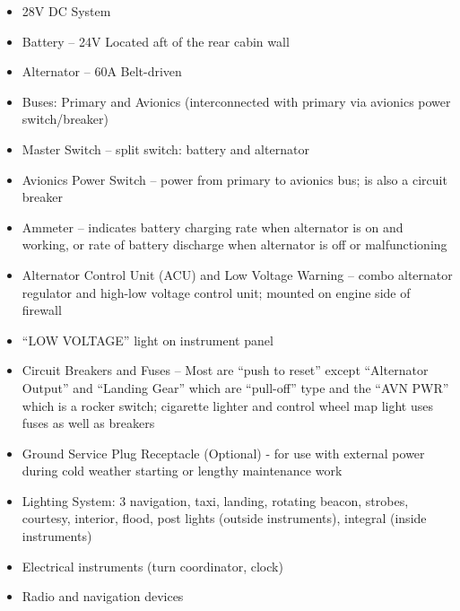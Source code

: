\documentclass[twoside,openright]{report}
\begin{document}
\begin{itemize}
  \item 28V DC System

  \item Battery -- 24V Located aft of the rear cabin wall

  \item Alternator -- 60A Belt-driven

  \item Buses: Primary and Avionics (interconnected with primary via avionics
    power switch/breaker)

  \item Master Switch -- split switch: battery and alternator

  \item Avionics Power Switch -- power from primary to avionics bus; is also a
    circuit breaker

  \item Ammeter -- indicates battery charging rate when alternator is on and
    working, or rate of battery discharge when alternator is off or
    malfunctioning

  \item Alternator Control Unit (ACU) and Low Voltage Warning -- combo alternator
    regulator and high-low voltage control unit; mounted on engine side of
    firewall

  \item ``LOW VOLTAGE'' light on instrument panel

  \item Circuit Breakers and Fuses -- Most are ``push to reset'' except
    ``Alternator Output'' and ``Landing Gear'' which are ``pull-off'' type and
    the ``AVN PWR'' which is a rocker switch; cigarette lighter and control
    wheel map light uses fuses as well as breakers

  \item Ground Service Plug Receptacle (Optional) - for use with external power
    during cold weather starting or lengthy maintenance work

  \item Lighting System: 3 navigation, taxi, landing, rotating beacon, strobes,
    courtesy, interior, flood, post lights (outside instruments), integral
    (inside instruments)

  \item Electrical instruments (turn coordinator, clock)

  \item Radio and navigation devices
\end{itemize}
\end{document}
